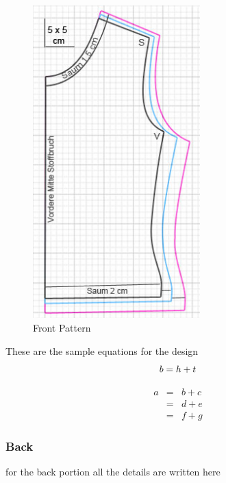 \documentclass[10pt,letterpaper]{ltugboat}
\begin{document}
\begin{figure}[ht!]
     \centering
     \includegraphics[width=64.54mm]{Front.jpg}
      \caption{Front Pattern}
      \label{fig:Front}
\end{figure}

These are the sample equations for the design
\begin{equation}
 b = h + t\\
\end{equation}

\begin{eqnarray}
a & = & b + c \\
& = & d + e \\
& = & f + g 
\end{eqnarray}

\subsubsection{Back}

for the back portion all the details are written here
\end{document}
